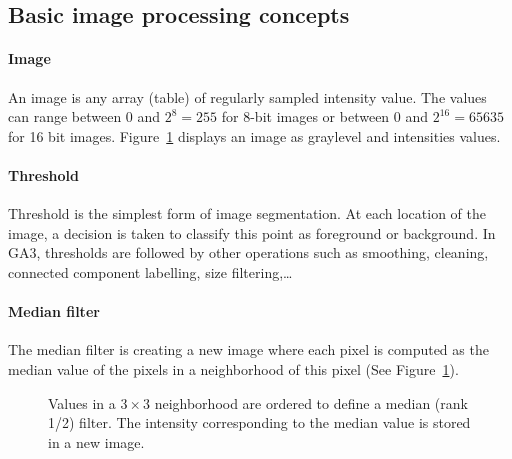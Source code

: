 \subsection{Basic image processing concepts}

\paragraph{Image} An image is any array (table) of regularly sampled intensity value. The values can range between $0$ and $2^8 = 255$ for 8-bit images or between $0$ and $2^{16}=65635$ for 16 bit images. Figure~\ref{fig:median} displays an image as graylevel and intensities values.

\paragraph{Threshold} Threshold is the simplest form of image segmentation. At each location of the image, a decision is taken to classify this point as foreground or background. In GA3, thresholds are followed by other operations such as smoothing, cleaning, connected component labelling, size filtering,\dots

\paragraph{Median filter} The median filter is creating a new image where each pixel is computed as the median value of the pixels in a neighborhood of this pixel (See Figure~\ref{fig:median}).


\begin{figure}\centering
    \caption{Values in a $3 \times 3$ neighborhood are ordered to define a median (rank 1/2)
    filter. The intensity corresponding to the median value is stored in a new image.}
    \label{fig:median}
\end{figure}

